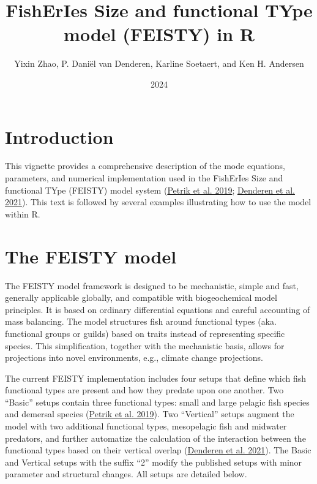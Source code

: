\documentclass[
]{article}
\title{FishErIes Size and functional TYpe model (FEISTY) in R}
\author{Yixin Zhao, P. Daniël van Denderen, Karline Soetaert, and Ken H.
Andersen}
\date{2024}
\begin{document}
\maketitle

\hypertarget{introduction}{%
\section{Introduction}\label{introduction}}

This vignette provides a comprehensive description of the mode
equations, parameters, and numerical implementation used in the
FishErIes Size and functional TYpe (FEISTY) model system
(\protect\hyperlink{ref-petrik2019bottom}{Petrik et al. 2019};
\protect\hyperlink{ref-van2021emergent}{Denderen et al. 2021}). This
text is followed by several examples illustrating how to use the model
within R.

\hypertarget{the-feisty-model}{%
\section{The FEISTY model}\label{the-feisty-model}}

The FEISTY model framework is designed to be mechanistic, simple and
fast, generally applicable globally, and compatible with biogeochemical
model principles. It is based on ordinary differential equations and
careful accounting of mass balancing. The model structures fish around
functional types (aka. functional groups or guilds) based on traits
instead of representing specific species. This simplification, together
with the mechanistic basis, allows for projections into novel
environments, e.g., climate change projections.

The current FEISTY implementation includes four setups that define which
fish functional types are present and how they predate upon one another.
Two ``Basic'' setups contain three functional types: small and large
pelagic fish species and demersal species
(\protect\hyperlink{ref-petrik2019bottom}{Petrik et al. 2019}). Two
``Vertical'' setups augment the model with two additional functional
types, mesopelagic fish and midwater predators, and further automatize
the calculation of the interaction between the functional types based on
their vertical overlap (\protect\hyperlink{ref-van2021emergent}{Denderen
et al. 2021}). The Basic and Vertical setups with the suffix ``2''
modify the published setups with minor parameter and structural changes.
All setups are detailed below.
\end{document}
